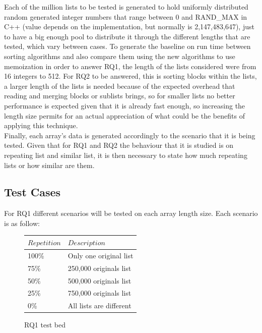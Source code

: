 \documentclass[a4paper,12pt]{article}
\begin{document}
Each of the million lists to be tested is generated to hold uniformly distributed random generated integer numbers that range between 0 and RAND\_MAX in C++ (value depends on the implementation, but normally is 2,147,483,647), just  to have a big enough pool to distribute it through the different lengths that are tested, which vary between cases. To generate the baseline on run time between sorting algorithms and also compare them using the new algorithms to use memoization in order to answer RQ1, the length of the lists considered were from 16 integers to 512. For RQ2 to be answered, this is sorting blocks within the lists, a larger length of the lists is needed because of the expected overhead that reading and merging blocks or sublists brings, so for smaller lists no better performance is expected given that it is already fast enough, so increasing the length size permits for an actual appreciation of what could be the benefits of applying this technique.\\

Finally, each array's data is generated accordingly to the scenario that it is being tested. Given that for RQ1 and RQ2 the behaviour that it is studied is on repeating list and similar list, it is then necessary to state how much repeating lists or how similar are them. 

\subsection{Test Cases}

For RQ1 different scenarios will be tested on each array length size. Each scenario is as follow:
\\

\begin{figure}[H]
\centering
\begin{tabular}{|l|l|} \toprule
	{$Repetition $} & {$Description$}  \\ \midrule
	100\% & Only one original list \\
	75\% & 250,000 originals list  \\
	50\% & 500,000 originals list \\
	25\% & 750,000 originals list \\
	0\% & All lists are different \\ \midrule
\end{tabular}
\caption{RQ1 test bed}
\end{figure}
\end{document}
